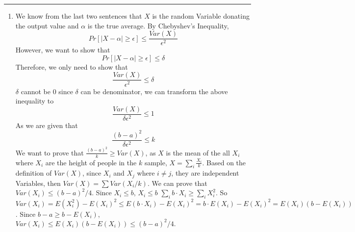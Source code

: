 \documentclass[11pt]{article}
\begin{document}




\begin{quote}

\end{quote}
\hrule


\begin{solution}
\item
\begin{enumerate}
    \item   We know from the last two sentences that $X$ is the random Variable donating the output value and $\alpha$ is the true average. By Chebyshev's Inequality, 
    $$Pr[|X-\alpha| \geq \epsilon] \leq \frac{Var(X)}{\epsilon ^2} $$
    However, we want to show that 
    $$Pr[|X-\alpha| \geq \epsilon] \leq \delta $$
    Therefore, we only need to show that 
    $$\frac{Var(X)}{\epsilon ^2} \leq \delta $$
    $\delta$ cannot be $0$ since $\delta$ can be denominator, we can transform the above inequality to 
    $$\frac{Var(X)}{\delta \epsilon ^2} \leq 1$$
    As we are given that 
    $$\frac{(b-a)^2}{\delta \epsilon ^2} \leq k$$
    We want to prove that $\frac{(b-a)^2}{k}\geq Var(X)$, as $X$ is the mean of the all $X_i$ where $X_i$ are the height of people in the $k$ sample, $X = \sum_i\frac {X_i}{k}$.
    \newline
    \newline
    Based on the definition of $Var(X)$, since $X_i$ and $X_j$ where $i \neq j$, they are independent Variables, then $Var(X) = \sum Var(X_i/k)$.
    \newline
    \newline
    We can prove that $Var(X_i) \leq (b-a)^2/4$.
    Since $X_i \leq b$, $X_i \leq b$ $\sum_i b \cdot X_i \geq \sum_i X_i^2$. So $Var(X_i) = E(X_i^2) - E(X_i)^2 \leq E(b \cdot X_i) - E(X_i)^2 = b\cdot E(X_i) - E(X_i)^2 = E(X_i)(b - E(X_i))$. Since $b-a \geq b-E(X_i)$, $Var(X_i) \leq E(X_i)(b - E(X_i)) \leq  (b-a)^2/4.$
    \newline


\end{enumerate}
\end{solution}
\end{document}
